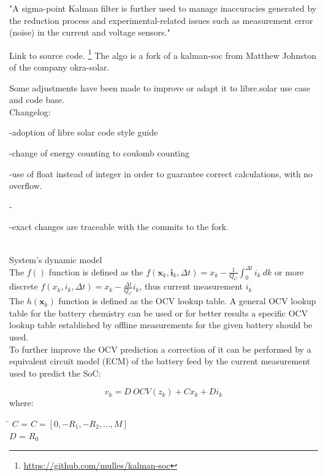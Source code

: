 "A sigma-point Kalman filter is further used to manage inaccuracies generated by the reduction process and experimental-related issues such as measurement error (noise) in the current and voltage sensors."




Link to source code. \footnote{ \url{https://github.com/mulles/kalman-soc} } The algo is a fork of a kalman-soc from  Matthew Johnston of the company okra-solar. 

Some adjustments have been made to improve or adapt it to libre.solar use case and code base. 
 \\


Changelog: 



-adoption of libre solar code style guide 

-change of energy counting to coulomb counting

-use of float instead of integer in order to guarantee correct calculations, with no overflow. 

-

-exact changes are traceable with the commits to the fork. 
\\
\
\
\


{System's dynamic model} \\

The $f() $ function is defined as the $ f({\boldsymbol {x}}_{k},{\boldsymbol {i}}_{k},\Delta{t}) = {x}_{k} - \frac{1}{{Q_{C}}}\int_{0}^{\Delta t} {i_{k}\ dk} $ or more discrete $f({x}_{k},{i}_{k},\Delta{t}) = {x}_{k} - \frac{\Delta t}{Q_{C}} i_{k} $, thus current measurement $ {i}_{k} $ \\

The $h({\boldsymbol {x}}_{{k}})$ function is defined as the OCV lookup table. A general OCV lookup table for the battery chemistry can be used or for better results a specific OCV lookup table established by offline measurements for the given battery should be used. \\
To further improve the OCV prediction a correction of it can be performed by a equivalent circuit model (ECM) of the battery feed by the current measurement used to predict the SoC: 

\begin{equation}
{v}_{k} = {D} \ {OCV}({z}_{k}) + C {x}_{k}  +  D {i}_{k}  
\end{equation}
where:
\begin{tabbing}
\phantom{$v(t)  \  $}\= \kill
$C$\> =   $C= [0, -R_1, -R_2, ..., M] $ \\
$D$\> = $R_0 $    \\
\end{tabbing}


